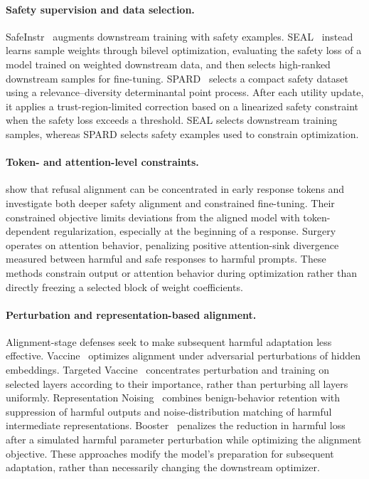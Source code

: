 \documentclass{article}
\begin{document}
\paragraph{Safety supervision and data selection.} SafeInstr~\citep{safeInstr} augments downstream training with safety examples. SEAL~\citep{seal} instead learns sample weights through bilevel optimization, evaluating the safety loss of a model trained on weighted downstream data, and then selects high-ranked downstream samples for fine-tuning. SPARD~\citep{chen2026spard} selects a compact safety dataset using a relevance--diversity determinantal point process. After each utility update, it applies a trust-region-limited correction based on a linearized safety constraint when the safety loss exceeds a threshold. SEAL selects downstream training samples, whereas SPARD selects safety examples used to constrain optimization.

\paragraph{Token- and attention-level constraints.} \citet{constrained_sft} show that refusal alignment can be concentrated in early response tokens and investigate both deeper safety alignment and constrained fine-tuning. Their constrained objective limits deviations from the aligned model with token-dependent regularization, especially at the beginning of a response. Surgery~\citep{liu2026surgery} operates on attention behavior, penalizing positive attention-sink divergence measured between harmful and safe responses to harmful prompts. These methods constrain output or attention behavior during optimization rather than directly freezing a selected block of weight coefficients.

\paragraph{Perturbation and representation-based alignment.} Alignment-stage defenses seek to make subsequent harmful adaptation less effective. Vaccine~\citep{huang2024vaccine} optimizes alignment under adversarial perturbations of hidden embeddings. Targeted Vaccine~\citep{liu2025targeted} concentrates perturbation and training on selected layers according to their importance, rather than perturbing all layers uniformly. Representation Noising~\citep{rosati2024representation} combines benign-behavior retention with suppression of harmful outputs and noise-distribution matching of harmful intermediate representations. Booster~\citep{huang2025booster} penalizes the reduction in harmful loss after a simulated harmful parameter perturbation while optimizing the alignment objective. These approaches modify the model's preparation for subsequent adaptation, rather than necessarily changing the downstream optimizer.
\end{document}
